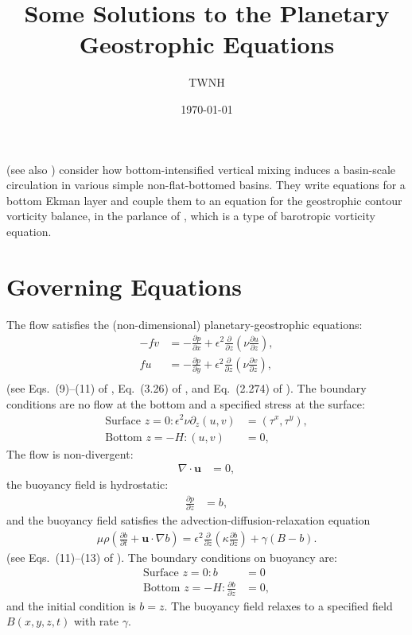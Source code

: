 \documentclass[10pt]{amsart}
\title{Some Solutions to the Planetary Geostrophic Equations}
\author{TWNH}
\date{\today}                                           %
\begin{document}
\maketitle

\citet{peterson&callies26} (see also \citealt{peterson&callies23}) consider how bottom-intensified vertical mixing induces a basin-scale circulation in various simple non-flat-bottomed basins.
They write equations for a bottom Ekman layer and couple them to an equation for the geostrophic contour vorticity balance, in the parlance of \citet{waldman&giordani23}, which is a type of barotropic vorticity equation.

\section{Governing Equations}
The flow satisfies the (non-dimensional) planetary-geostrophic equations:
\begin{align}
- f v & = - \frac{\partial p}{\partial x} + \epsilon^2 \frac{\partial}{\partial z} \left( \nu \frac{\partial u}{\partial z} \right), \label{eqn:u_mom} \\
f  u & = - \frac{\partial p}{\partial y} + \epsilon^2 \frac{\partial}{\partial z} \left( \nu \frac{\partial v}{\partial z} \right),  \label{eqn:v_mom} \\
\end{align}
(see Eqs.~(9)--(11) of \citealt{peterson&callies26}, Eq.~(3.26) of \citealt{klinger&haine19}, and Eq.~(2.274) of \citealt{vallis06}).
The boundary conditions are no flow at the bottom and a specified stress at the surface:
\begin{align}
\text{Surface~}z = 0:
\epsilon^2 \nu \partial_z (u, v) & = (\tau^x , \tau^y ), 
 \\
\text{Bottom~}z = -H:
(u, v) & = 0 ,
\end{align}
The flow is non-divergent:
\begin{align}
\nabla \cdot {\mathbf u} & = 0 ,
\end{align}
the buoyancy field is hydrostatic:
\begin{align}
\frac{\partial p}{\partial z} & = b ,
\end{align}
and the buoyancy field satisfies the advection-diffusion-relaxation equation
\begin{align}
\mu \rho \left( \frac{\partial b}{\partial t} + {\mathbf u} \cdot \nabla b \right) = \epsilon^2 \frac{\partial }{\partial z} \left( \kappa \frac{\partial b}{\partial z} \right) + \gamma \left( B - b \right).
\label{eqn:b}
\end{align}
(see Eqs.~(11)--(13) of \citealt{peterson&callies26}).
The boundary conditions on buoyancy are:
\begin{align}
\text{Surface~}z = 0:
b &= 0
\label{eqn:sfc_b_bc}
 \\
\text{Bottom~}z = -H:
\frac{\partial b}{\partial z} &= 0 ,
\label{eqn:bot_b_bc}
\end{align}
and the initial condition is $b = z$.
The buoyancy field relaxes to a specified field $B(x, y, z, t)$ with rate $\gamma$.
\end{document}
